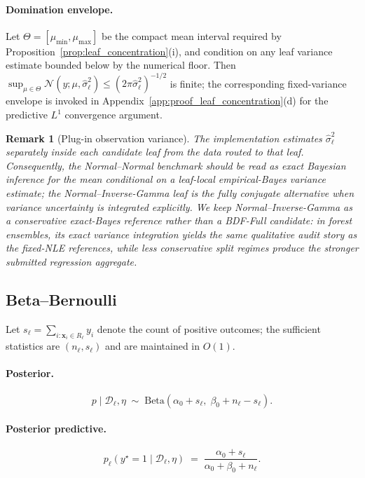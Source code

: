 \documentclass[10pt]{article} %
\newtheorem{remark}[theorem]{Remark}
\begin{document}
\paragraph{Domination envelope.}
Let $\Theta = [\mu_{\min}, \mu_{\max}]$ be the compact mean interval required by Proposition~\ref{prop:leaf_concentration}(i), and condition on any leaf variance estimate bounded below by the numerical floor. Then $\sup_{\mu\in\Theta} \mathcal{N}(y;\mu,\hat\sigma_\ell^2) \le (2\pi\hat\sigma_\ell^2)^{-1/2}$ is finite; the corresponding fixed-variance envelope is invoked in Appendix~\ref{app:proof_leaf_concentration}(d) for the predictive $L^1$ convergence argument.

\begin{remark}[Plug-in observation variance]
The implementation estimates $\hat\sigma_\ell^2$ separately inside each candidate leaf from the data routed to that leaf. Consequently, the Normal--Normal benchmark should be read as exact Bayesian inference for the mean conditional on a leaf-local empirical-Bayes variance estimate; the Normal--Inverse-Gamma leaf is the fully conjugate alternative when variance uncertainty is integrated explicitly.
We keep Normal--Inverse-Gamma as a conservative exact-Bayes reference rather than a BDF-Full candidate: in forest ensembles, its exact variance integration yields the same qualitative audit story as the fixed-NLE references, while less conservative split regimes produce the stronger submitted regression aggregate.
\end{remark}


\subsection{Beta--Bernoulli}\label{app:conjugate_beta}

Let $s_\ell = \sum_{i:\mathbf{x}_i\in R_\ell} y_i$ denote the count of positive outcomes; the sufficient statistics are $(n_\ell, s_\ell)$ and are maintained in $O(1)$.

\paragraph{Posterior.}
\begin{equation}\label{eq:beta_posterior}
p \mid \mathcal{D}_\ell,\eta \;\sim\; \mathrm{Beta}\!\left(\alpha_0 + s_\ell,\; \beta_0 + n_\ell - s_\ell\right).
\end{equation}

\paragraph{Posterior predictive.}
\begin{equation}\label{eq:beta_predictive}
p_\ell(y^\star = 1 \mid \mathcal{D}_\ell,\eta) \;=\; \frac{\alpha_0 + s_\ell}{\alpha_0 + \beta_0 + n_\ell}.
\end{equation}
\end{document}
